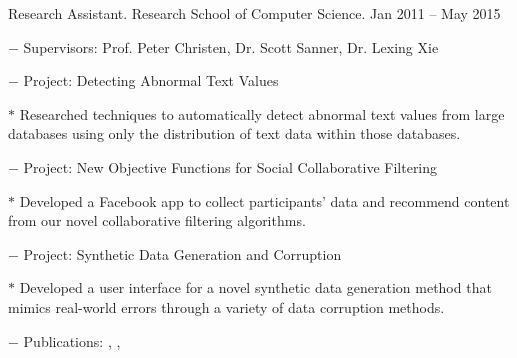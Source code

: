 \documentclass[10pt]{article}
\begin{document}
\begin{innerlist}
	\item Research Assistant. Research School of Computer Science. \hfill {Jan 2011 -- May 2015}
	\begin{innerlist}
		\item[$-$] Supervisors: Prof. Peter Christen, Dr. Scott Sanner, Dr. Lexing Xie
		\item[$-$] Project: Detecting Abnormal Text Values
		\begin{innerlist}
			\item[$*$] Researched techniques to automatically detect abnormal text values from large databases using only the distribution of text data within those databases.
		\end{innerlist}
		\item[$-$] Project: New Objective Functions for Social Collaborative Filtering
		\begin{innerlist}
			\item[$*$] Developed a Facebook app to collect participants' data and recommend content from our novel collaborative filtering algorithms. %
		\end{innerlist}
		\item[$-$] Project: Synthetic Data Generation and Corruption
		\begin{innerlist}
			\item[$*$] Developed a user interface for a novel synthetic data generation method that mimics real-world errors through a variety of data corruption methods.
		\end{innerlist}
		\item[$-$] Publications: \cite{Christen2016}, \cite{Noel2012}, \cite{Tran2013b}
	\end{innerlist}
	

\end{innerlist}
\end{document}
